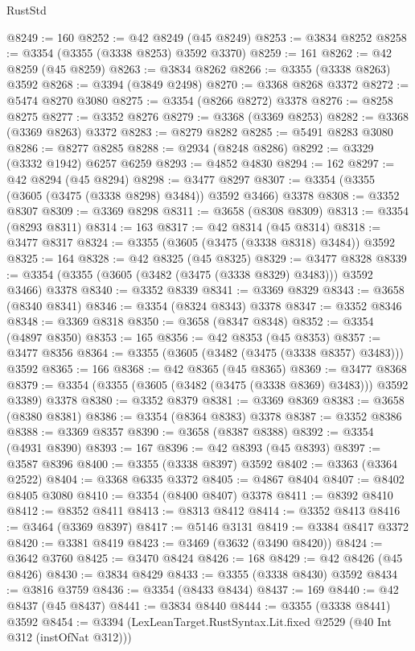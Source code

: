 \begin{lexlean}{RustStd}
\begin{coremodule}
@8249 := 160
@8252 := @42 @8249 (@45 @8249)
@8253 := @3834 @8252
@8258 := @3354 (@3355 (@3338 @8253) @3592 @3370)
@8259 := 161
@8262 := @42 @8259 (@45 @8259)
@8263 := @3834 @8262
@8266 := @3355 (@3338 @8263) @3592
@8268 := @3394 (@3849 @2498)
@8270 := @3368 @8268 @3372
@8272 := @5474 @8270 @3080
@8275 := @3354 (@8266 @8272) @3378
@8276 := @8258 @8275
@8277 := @3352 @8276
@8279 := @3368 (@3369 @8253)
@8282 := @3368 (@3369 @8263) @3372
@8283 := @8279 @8282
@8285 := @5491 @8283 @3080
@8286 := @8277 @8285
@8288 := @2934 (@8248 @8286)
@8292 := @3329 (@3332 @1942) @6257 @6259
@8293 := @4852 @4830
@8294 := 162
@8297 := @42 @8294 (@45 @8294)
@8298 := @3477 @8297
@8307 := @3354 (@3355 (@3605 (@3475 (@3338 @8298) @3484)) @3592 @3466) @3378
@8308 := @3352 @8307
@8309 := @3369 @8298
@8311 := @3658 (@8308 @8309)
@8313 := @3354 (@8293 @8311)
@8314 := 163
@8317 := @42 @8314 (@45 @8314)
@8318 := @3477 @8317
@8324 := @3355 (@3605 (@3475 (@3338 @8318) @3484)) @3592
@8325 := 164
@8328 := @42 @8325 (@45 @8325)
@8329 := @3477 @8328
@8339 := @3354 (@3355 (@3605 (@3482 (@3475 (@3338 @8329) @3483))) @3592 @3466) @3378
@8340 := @3352 @8339
@8341 := @3369 @8329
@8343 := @3658 (@8340 @8341)
@8346 := @3354 (@8324 @8343) @3378
@8347 := @3352 @8346
@8348 := @3369 @8318
@8350 := @3658 (@8347 @8348)
@8352 := @3354 (@4897 @8350)
@8353 := 165
@8356 := @42 @8353 (@45 @8353)
@8357 := @3477 @8356
@8364 := @3355 (@3605 (@3482 (@3475 (@3338 @8357) @3483))) @3592
@8365 := 166
@8368 := @42 @8365 (@45 @8365)
@8369 := @3477 @8368
@8379 := @3354 (@3355 (@3605 (@3482 (@3475 (@3338 @8369) @3483))) @3592 @3389) @3378
@8380 := @3352 @8379
@8381 := @3369 @8369
@8383 := @3658 (@8380 @8381)
@8386 := @3354 (@8364 @8383) @3378
@8387 := @3352 @8386
@8388 := @3369 @8357
@8390 := @3658 (@8387 @8388)
@8392 := @3354 (@4931 @8390)
@8393 := 167
@8396 := @42 @8393 (@45 @8393)
@8397 := @3587 @8396
@8400 := @3355 (@3338 @8397) @3592
@8402 := @3363 (@3364 @2522)
@8404 := @3368 @6335 @3372
@8405 := @4867 @8404
@8407 := @8402 @8405 @3080
@8410 := @3354 (@8400 @8407) @3378
@8411 := @8392 @8410
@8412 := @8352 @8411
@8413 := @8313 @8412
@8414 := @3352 @8413
@8416 := @3464 (@3369 @8397)
@8417 := @5146 @3131
@8419 := @3384 @8417 @3372
@8420 := @3381 @8419
@8423 := @3469 (@3632 (@3490 @8420))
@8424 := @3642 @3760
@8425 := @3470 @8424
@8426 := 168
@8429 := @42 @8426 (@45 @8426)
@8430 := @3834 @8429
@8433 := @3355 (@3338 @8430) @3592
@8434 := @3816 @3759
@8436 := @3354 (@8433 @8434)
@8437 := 169
@8440 := @42 @8437 (@45 @8437)
@8441 := @3834 @8440
@8444 := @3355 (@3338 @8441) @3592
@8454 := @3394 (LexLeanTarget.RustSyntax.Lit.fixed @2529 (@40 Int @312 (instOfNat @312)))

\end{coremodule}
\end{lexlean}
